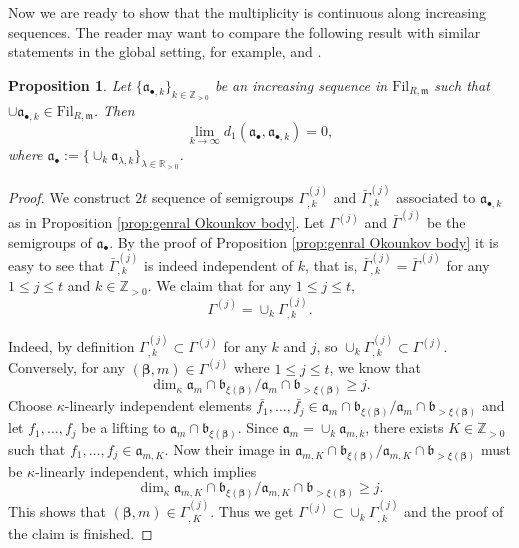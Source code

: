\documentclass[11pt, leqno]{amsart}%
\theoremstyle{plain}
\newtheorem{proposition}[theorem]{Proposition}
\theoremstyle{definition}
\theoremstyle{remark}
\newcommand{\bR}{\mathbb{R}}
\newcommand{\bZ}{\mathbb{Z}}
\newcommand{\fa}{\mathfrak{a}}
\newcommand{\fb}{\mathfrak{b}}
\newcommand{\fm}{\mathfrak{m}}
\newcommand{\Fil}{\mathrm{Fil}}
\numberwithin{equation}{section}
\begin{document}
Now we are ready to show that the multiplicity is continuous along increasing sequences. The reader may want to compare the following result with similar statements in the global setting, for example, \cite[Proposition 6.11]{Dar17} and \cite[Lemma 4.7]{BJ21}.


\begin{proposition}\label{prop:continuous along increasing sequences}
    Let $\{\fa_{\bullet,k}\}_{k\in\bZ_{>0}}$ be an increasing sequence in $\Fil_{R,\fm}$ such that $\cup \fa_{\bullet,k}\in\Fil_{R,\fm}$. Then
    \[
        \lim_{k\to\infty} d_1(\fa_\bullet,\fa_{\bullet,k})=0,
    \]
    where $\fa_\bullet:=\{\cup_k \fa_{\lambda,k}\}_{\lambda\in\bR_{>0}}$.
\end{proposition}

\begin{proof}
    We construct $2t$ sequence of semigroups $\Gamma_{,k}^{(j)}$ and $\bar\Gamma_{,k}^{(j)}$ associated to $\fa_{\bullet,k}$ as in Proposition \ref{prop:genral Okounkov body}. Let $\Gamma^{(j)}$ and $\bar\Gamma^{(j)}$ be the semigroups of $\fa_\bullet$. By the proof of Proposition \ref{prop:genral Okounkov body} it is easy to see that $\bar\Gamma_{,k}^{(j)}$ is indeed independent of $k$, that is, $\bar\Gamma_{,k}^{(j)}=\bar\Gamma^{(j)}$ for any $1\le j\le t$ and $k\in\bZ_{>0}$. We claim that for any $1\le j\le t$,
    \begin{equation}
        \Gamma^{(j)}=\cup_k \Gamma_{,k}^{(j)}.
    \end{equation}
	
    Indeed, by definition $\Gamma_{,k}^{(j)}\subset\Gamma^{(j)}$ for any $k$ and $j$, so $\cup_k \Gamma_{,k}^{(j)}\subset\Gamma^{(j)}$. Conversely, for any $(\bm\beta,m)\in\Gamma^{(j)}$ where $1\le j\le t$, we know that
    \[
        \dim_\kappa \fa_m\cap\fb_{\xi(\bm\beta)}/\fa_m\cap\fb_{>\xi(\bm\beta)}\ge j.
    \]
    Choose $\kappa$-linearly independent elements $\bar{f_1},\ldots,\bar{f_j}\in \fa_m\cap\fb_{\xi(\bm\beta)}/\fa_m\cap\fb_{>\xi(\bm\beta)}$ and let $f_1,\ldots,f_j$ be a lifting to $\fa_m\cap\fb_{\xi(\bm\beta)}$. Since $\fa_m=\cup_k \fa_{m,k}$, there exists $K\in\bZ_{>0}$ such that $f_1,\ldots,f_j\in\fa_{m,K}$. Now their image in $\fa_{m,K}\cap\fb_{\xi(\bm\beta)}/\fa_{m,K}\cap\fb_{>\xi(\bm\beta)}$ must be $\kappa$-linearly independent, which implies
    \[
        \dim_\kappa \fa_{m,K}\cap\fb_{\xi(\bm\beta)}/\fa_{m,K}\cap\fb_{>\xi(\bm\beta)}\ge j.
    \]
    This shows that $(\bm\beta,m)\in\Gamma_{,K}^{(j)}$. Thus we get $\Gamma^{(j)}\subset \cup_k \Gamma_{,k}^{(j)}$ and the proof of the claim is finished.
	

\end{proof}
\end{document}
